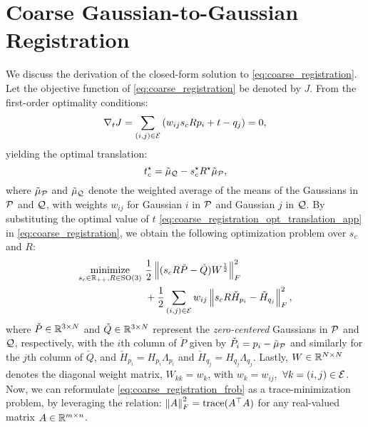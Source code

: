 \section{Coarse Gaussian-to-Gaussian Registration}
\label{app:method}
We discuss the derivation of the closed-form solution to \eqref{eq:coarse_registration}.
Let the objective function of \eqref{eq:coarse_registration} be denoted by $J$.
From the first-order optimality conditions: 
\begin{equation}
    \nabla_{t} J = \sum_{(i, j) \in \mathcal{E}} \left( w_{ij} s_{c}Rp_{i} + t - q_{j} \right) = 0,
\end{equation}
yielding the optimal translation:
\begin{equation}
    \label{eq:coarse_registration_opt_translation_app}
    t_{c}^{\star} = \tilde{\mu}_{\mathcal{Q}} - s_{c}^{\star} R^{\star} \tilde{\mu}_{\mathcal{P}},
\end{equation}
where ${\tilde{\mu}_{\mathcal{P}}}$ and ${\tilde{\mu}_{\mathcal{Q}}}$ denote the weighted average of the means of the Gaussians in $\mathcal{P}$ and $\mathcal{Q}$, with weights $w_{ij}$ for Gaussian $i$ in $\mathcal{P}$ and Gaussian $j$ in $\mathcal{Q}$.
By substituting the optimal value of $t$ \eqref{eq:coarse_registration_opt_translation_app} in \eqref{eq:coarse_registration}, we obtain the following optimization problem over $s_{c}$ and $R$:
\begin{equation}
    \label{eq:coarse_registration_frob}
    \begin{aligned}
        \underset{s_{c} \in \mathbb{R}_{++}, R \in \mathrm{SO}(3)}{\mathrm{minimize}}\  &\frac{1}{2} \left\Vert (s_{c}R\check{P} - \check{Q})W^{\frac{1}{2}} \right\Vert_{F}^{2} \\
        & + \frac{1}{2} \sum_{(i, j) \in \mathcal{E}}  w_{ij} \left\Vert s_{c}R \check{H}_{p_{i}} - \check{H}_{q_{j}} \right\Vert_{F}^{2},
    \end{aligned}
\end{equation}
where ${\check{P} \in \mathbb{R}^{3 \times N}}$ and ${\check{Q} \in \mathbb{R}^{3 \times N}}$ represent the \emph{zero-centered} Gaussians in $\mathcal{P}$ and ${\mathcal{Q}}$, respectively, with the $i$th column of $\check{P}$ given by ${\check{P}_{i} = p_{i} - \tilde{\mu}_{\mathcal{P}}}$ and similarly for the $j$th column of $\check{Q}$, and 
${\check{H}_{p_{i}} = H_{p_{i}}  \Lambda_{p_{i}}}$ and ${\check{H}_{q_{j}} = H_{q_{j}}  \Lambda_{q_{j}}}$. Lastly, ${W \in \mathbb{R}^{N \times N}}$ denotes the diagonal weight matrix, ${W_{kk} = w_{k}}$, with ${w_{k} = w_{ij}}$,~${\forall k = (i, j) \in \mathcal{E}}$.
Now, we can reformulate \eqref{eq:coarse_registration_frob} as a trace-minimization problem, by leveraging the relation: ${\left\Vert A \right\Vert_{F}^{2} = \mathrm{trace}(A^{\top}A)}$ for any real-valued matrix ${A \in \mathbb{R}^{m \times n}}$.
